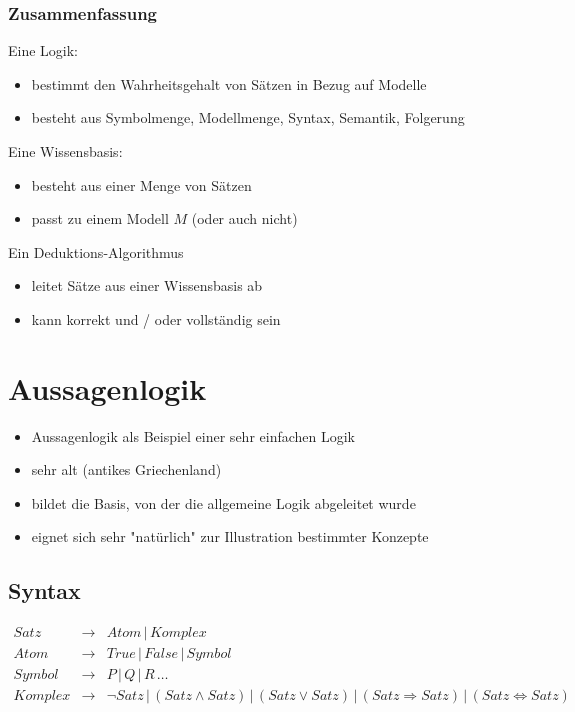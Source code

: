 \subsubsection*{Zusammenfassung}

Eine Logik:
\begin{itemize}
\item bestimmt den Wahrheitsgehalt von Sätzen in Bezug auf Modelle
\item besteht aus Symbolmenge, Modellmenge, Syntax, Semantik, Folgerung
\end{itemize}
Eine Wissensbasis:
\begin{itemize}
\item besteht aus einer Menge von Sätzen
\item passt zu einem Modell $M$ (oder auch nicht)
\end{itemize}
Ein Deduktions-Algorithmus
\begin{itemize}
\item leitet Sätze aus einer Wissensbasis ab
\item kann korrekt und / oder vollständig sein
\end{itemize}

\section{Aussagenlogik}

\begin{itemize}
\item Aussagenlogik als Beispiel einer sehr einfachen Logik
\item sehr alt (antikes Griechenland)
\item bildet die Basis, von der die allgemeine Logik abgeleitet wurde
\item eignet sich sehr "{}natürlich"{} zur Illustration bestimmter Konzepte
\end{itemize}

\subsection{Syntax}

\begin{eqnarray*}
Satz &\to& Atom \, | \, Komplex \\ Atom &\to& True \, | \, False \, | \, Symbol \\ Symbol &\to& P \, | \, Q \, | \, R \, \dots \\
Komplex &\to& \neg Satz \, | \, (Satz \wedge Satz) \, | \, (Satz \vee Satz) \, | \, (Satz \Rightarrow Satz) \, | \, (Satz \Leftrightarrow Satz)
\end{eqnarray*}

